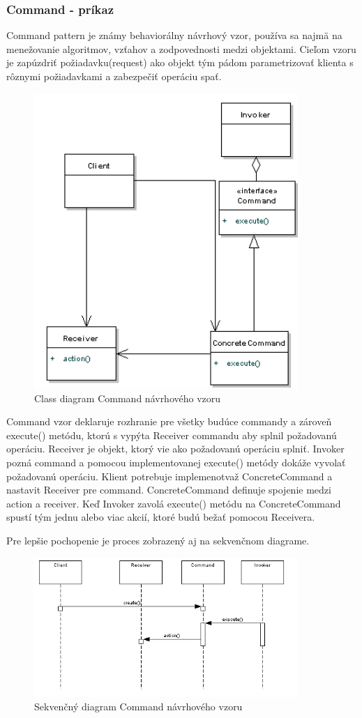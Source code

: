 \subsubsection{Command - príkaz}
\indent Command pattern je známy behaviorálny návrhový vzor, používa sa najmä na menežovanie algoritmov, vzťahov a zodpovednosti medzi objektami. 
Cieľom vzoru je zapúzdriť požiadavku(request) ako objekt tým pádom parametrizovať klienta s rôznymi požiadavkami a zabezpečiť operáciu spať.
\begin{figure}[!htbp]
	\centering
	\includegraphics[width=10cm]{img/command_pattern_class.jpg}
	\caption{Class diagram Command návrhového vzoru}
	\label{fig:test}
\end{figure}
\newline
Command vzor deklaruje rozhranie pre všetky budúce commandy a zároveň execute() metódu, ktorú s vypýta Receiver commandu aby splnil požadovanú operáciu.
Receiver je objekt, ktorý vie ako požadovanú operáciu splniť. Invoker pozná command a pomocou implementovanej execute() metódy dokáže vyvolať požadovanú operáciu.
Klient potrebuje implemenotvaž ConcreteCommand a nastavit Receiver pre command. ConcreteCommand definuje spojenie medzi action a receiver. Keď Invoker zavolá execute() metódu na ConcreteCommand spustí tým jednu alebo viac akcií, ktoré budú bežať pomocou Receivera.

Pre lepšie pochopenie je proces zobrazený aj na sekvenčnom diagrame.
\begin{figure}[!htbp]
	\centering
	\includegraphics[width=10cm]{img/command_seq.jpg}
	\caption{Sekvenčný diagram Command návrhového vzoru}
	\label{fig:test}
\end{figure}
\newline

